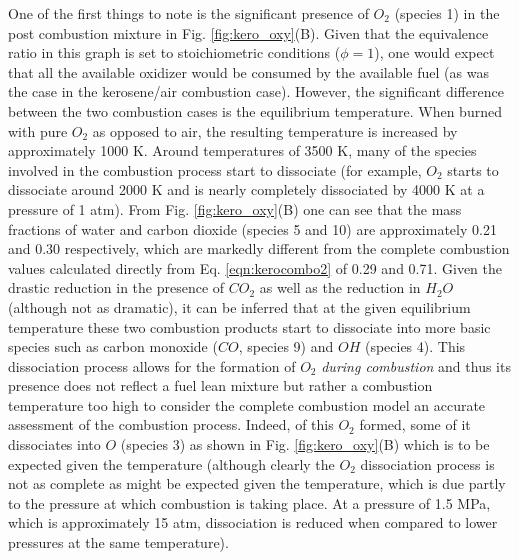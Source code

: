 	One of the first things to note is the significant presence of $O_2$ (species 1) in the
post combustion mixture in Fig. \ref{fig:kero_oxy}(B).  Given that the equivalence ratio in this 
graph is set to stoichiometric conditions ($\phi = 1$), one would expect that all the available oxidizer
would be consumed by the available fuel (as was the case in the kerosene/air combustion case).  However,
the significant difference between the two combustion cases is the equilibrium temperature.  When
burned with pure $O_2$ as opposed to air, the resulting temperature is increased by approximately 1000 K.  
Around temperatures of 3500 K, many of the species involved in the combustion process
start to dissociate (for example, $O_2$ starts to dissociate around 2000 K and is nearly completely
dissociated by 4000 K at a pressure of 1 atm).  From Fig. \ref{fig:kero_oxy}(B) one can see that the mass fractions of 
water and carbon dioxide (species 5 and 10) are approximately 0.21 and 0.30 respectively, which are markedly different from 
the complete combustion values calculated directly from Eq. \ref{eqn:kerocombo2} of 0.29 and 0.71.  
Given the drastic reduction in 
the presence of $CO_2$ as well as the reduction in $H_2O$ (although not as dramatic), it can be inferred that 
at the given equilibrium temperature these two combustion products start to dissociate into more basic 
species such as carbon monoxide ($CO$, species 9) and $OH$ (species 4).  This dissociation process allows for 
the formation of $O_2$ \emph{during combustion} and thus its presence does not reflect a fuel lean mixture but rather
a combustion temperature too high to consider the complete combustion model an accurate assessment of the
combustion process.  Indeed, of this $O_2$ formed, some of it dissociates into $O$ (species 3) as shown in 
Fig. \ref{fig:kero_oxy}(B) which is to be expected given the temperature (although clearly the $O_2$ 
dissociation process is not as complete as might be expected given the temperature, which is due partly to the 
pressure at which combustion is taking place.  At a pressure of 1.5 MPa, which is approximately 15 atm, 
dissociation is reduced when compared to lower pressures at the same temperature).  

